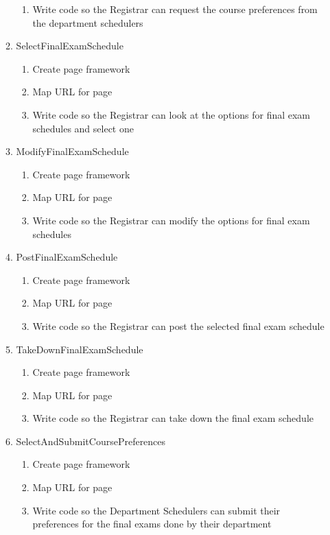 \documentclass[11pt]{article}
\begin{document}
\begin{enumerate}
\begin{enumerate}
\begin{enumerate}
\item Write code so the Registrar can request the course preferences from the department 
schedulers
\end{enumerate} 
\item SelectFinalExamSchedule
\begin{enumerate} 
\item Create page framework
\item Map URL for page
\item Write code so the Registrar can look at the options for final exam schedules and select 
one
\end{enumerate}
\item ModifyFinalExamSchedule
 \begin{enumerate} 
\item Create page framework
\item Map URL for page
\item Write code so the Registrar can modify the options for final exam schedules
\end{enumerate}
\item PostFinalExamSchedule
 \begin{enumerate}
\item Create page framework
\item Map URL for page
\item Write code so the Registrar can post the selected final exam schedule
\end{enumerate}
\item TakeDownFinalExamSchedule
 \begin{enumerate} 
\item Create page framework
\item Map URL for page
\item Write code so the Registrar can take down the final exam schedule
\end{enumerate} 
\item SelectAndSubmitCoursePreferences
\begin{enumerate} 
\item Create page framework
\item Map URL for page
\item Write code so the Department Schedulers can submit their preferences for the final exams 
done by their department
\end{enumerate} 
\end{enumerate}
\end{enumerate}


\clearpage
\end{document}
